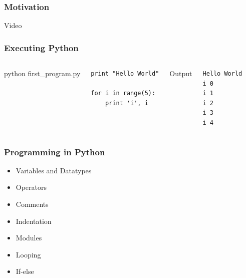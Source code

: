 \documentclass{beamer}
\begin{document}
\begin{frame}[fragile]
\begin{columns}[t]
    \end{columns}

\end{frame}


\begin{frame}[fragile]

    \frametitle{Motivation}

    \begin{center}
        Video %
    \end{center}

\end{frame}


\begin{frame}[fragile]

    \frametitle{Executing Python}

    \begin{columns}[t]


            \begin{center}
                python first\_program.py
            \end{center}

\begin{lstlisting}
print "Hello World"

for i in range(5):
    print 'i', i
\end{lstlisting}


            \begin{center}
                Output
            \end{center}

\begin{lstlisting}
Hello World
i 0
i 1
i 2
i 3
i 4
\end{lstlisting}


    \end{columns}


\end{frame}



\begin{frame}[fragile]

    \frametitle{Programming in Python}

    \begin{itemize}
        \item Variables and Datatypes
        \item Operators
        \item Comments
        \item Indentation
        \item Modules
        \item Looping
        \item If-else
    \end{itemize}

\end{frame}
\end{document}
